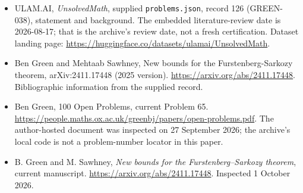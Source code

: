 \documentclass[11pt,a4paper]{article}
\begin{document}
{\small

\begin{itemize}

\item[\hypertarget{source:126:1}{S1}] ULAM.AI, \emph{UnsolvedMath}, supplied \texttt{problems.json}, record 126 (GREEN-038), statement and background. The embedded literature-review date is 2026-08-17; that is the archive’s review date, not a fresh certification. Dataset landing page: \url{https://huggingface.co/datasets/ulamai/UnsolvedMath}.

\item[\hypertarget{source:126:2}{S2}] Ben Green and Mehtaab Sawhney, New bounds for the Furstenberg-Sarkozy theorem, arXiv:2411.17448 (2025 version). \url{https://arxiv.org/abs/2411.17448}. Bibliographic information from the supplied record.

\item[\hypertarget{source:126:3}{S3}] Ben Green, 100 Open Problems, current Problem 65. \url{https://people.maths.ox.ac.uk/greenbj/papers/open-problems.pdf}. The author-hosted document was inspected on 27 September 2026; the archive’s local code is not a problem-number locator in this paper.

\item[E1] B. Green and M. Sawhney, \emph{New bounds for the Furstenberg--Sarkozy theorem}, current manuscript. \url{https://arxiv.org/abs/2411.17448}. Inspected 1 October 2026.

\end{itemize}

}

\label{end:126}
\end{document}
